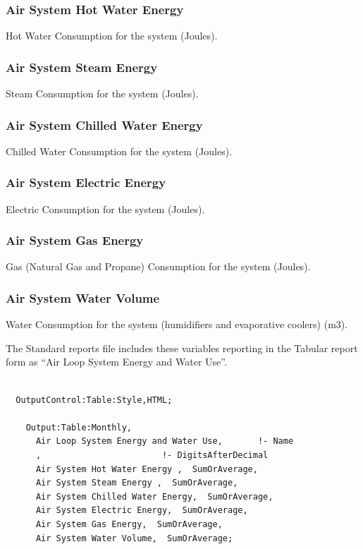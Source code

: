 \subsubsection{Air System Hot Water Energy}\label{air-system-hot-water-energy}

Hot Water Consumption for the system (Joules).

\subsubsection{Air System Steam Energy}\label{air-system-steam-energy}

Steam Consumption for the system (Joules).

\subsubsection{Air System Chilled Water Energy}\label{air-system-chilled-water-energy}

Chilled Water Consumption for the system (Joules).

\subsubsection{Air System Electric Energy}\label{air-system-electric-energy}

Electric Consumption for the system (Joules).

\subsubsection{Air System Gas Energy}\label{air-system-gas-energy}

Gas (Natural Gas and Propane) Consumption for the system (Joules).

\subsubsection{Air System Water Volume}\label{air-system-water-volume}

Water Consumption for the system (humidifiers and evaporative coolers) (m3).

The Standard reports file includes these variables reporting in the Tabular report form as ``Air Loop System Energy and Water Use''.

\begin{lstlisting}

  OutputControl:Table:Style,HTML;

    Output:Table:Monthly,
      Air Loop System Energy and Water Use,       !- Name
      ,                        !- DigitsAfterDecimal
      Air System Hot Water Energy ,  SumOrAverage,
      Air System Steam Energy ,  SumOrAverage,
      Air System Chilled Water Energy,  SumOrAverage,
      Air System Electric Energy,  SumOrAverage,
      Air System Gas Energy,  SumOrAverage,
      Air System Water Volume,  SumOrAverage;
\end{lstlisting}

